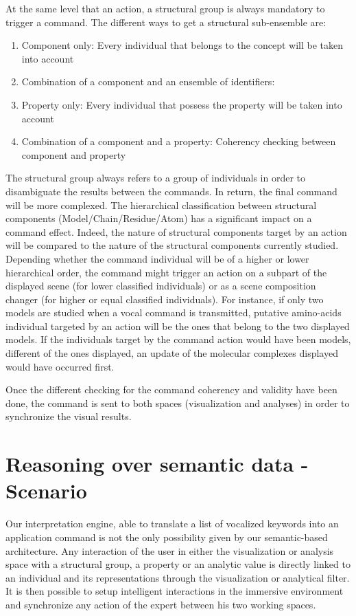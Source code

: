 \documentclass{vgtc}                          %
\begin{document}
At the same level that an action, a structural group is always mandatory to trigger a command. The different ways to get a structural sub-ensemble are:

\begin{enumerate}
  \item Component only: Every individual that belongs to the concept will be taken into account
  \item Combination of a component and an ensemble of identifiers: 
  \item Property only: Every individual that possess the property will be taken into account
  \item Combination of a component and a property: Coherency checking between component and property
\end{enumerate}

The structural group always refers to a group of individuals in order to disambiguate the results between the commands. In return, the final command will be more complexed.
The hierarchical classification between structural components (Model/Chain/Residue/Atom) has a significant impact on a command effect. Indeed, the nature of structural components target by an action will be compared to the nature of the structural components currently studied. Depending whether the command individual will be of a higher or lower hierarchical order, the command might trigger an action on a subpart of the displayed scene (for lower classified individuals) or as a scene composition changer (for higher or equal classified individuals).
For instance, if only two models are studied when a vocal command is transmitted, putative amino-acids individual targeted by an action will be the ones that belong to the two displayed models. If the individuals target by the command action would have been models, different of the ones displayed, an update of the molecular complexes displayed would have occurred first.

Once the different checking for the command coherency and validity have been done, the command is sent to both spaces (visualization and analyses) in order to synchronize the visual results.

\section{Reasoning over semantic data - Scenario}

Our interpretation engine, able to translate a list of vocalized keywords into an application command is not the only possibility given by our semantic-based architecture. Any interaction of the user in either the visualization or analysis space with a structural group, a property or an analytic value is directly linked to an individual and its representations through the visualization or analytical filter. It is then possible to setup intelligent interactions in the immersive environment and synchronize any action of the expert between his two working spaces.
\end{document}
